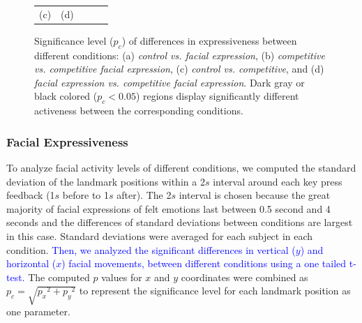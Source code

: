 \begin{figure}[t!]
\begin{center}
\begin{tabular}{c c c c c}
   (c)& (d)\\%
 \end{tabular}
\end{center}
\caption{%
Significance level ($p_c$) of differences in expressiveness
between different conditions: (a) \emph{control vs. facial
expression}, (b) \emph{competitive vs. competitive facial
expression}, (c) \emph{control vs. competitive}, and (d)
\emph{facial expression vs. competitive facial expression}.
Dark gray or black colored ($p_c<0.05$) regions display
significantly different activeness between the corresponding
conditions.} \label{markers}
\end{figure}

\subsubsection{Facial Expressiveness}

To analyze facial activity levels of different conditions, we
computed the standard deviation of the landmark positions within a 2$s$
interval around each key press feedback (1$s$ before to 1$s$
after). The 2$s$ interval is chosen because the great majority of facial expressions of felt emotions last between 0.5 second and 4 seconds \cite{ekman1984expression} and the differences of standard deviations between conditions are largest in this case. Standard deviations were averaged for each
subject in each condition. \textcolor{blue}{Then, we analyzed the significant
differences in vertical ($y$) and horizontal ($x$) facial
movements, between different conditions using a one tailed t-test.} The computed
$p$ values for $x$ and $y$ coordinates were combined as
$p_c=\sqrt{{p_x}^2+{p_y}^2}$ to represent the significance level
for each landmark position as one parameter.




